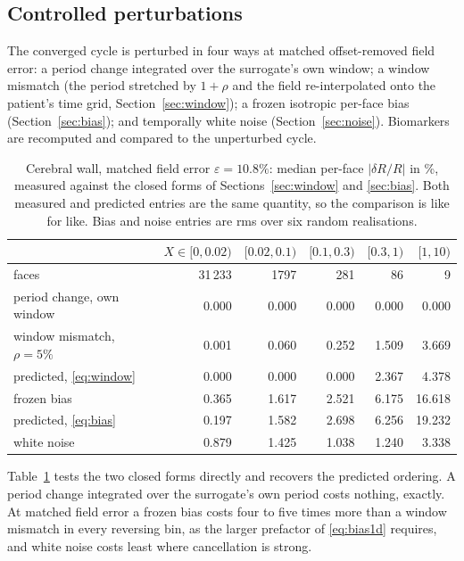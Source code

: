 \documentclass[11pt,a4paper]{article}
\newcommand{\eps}{\varepsilon}
\begin{document}
\subsection{Controlled perturbations}

The converged cycle is perturbed in four ways at matched offset-removed field
error: a period change integrated over the surrogate's own window; a window
mismatch (the period stretched by $1+\rho$ and the field re-interpolated onto
the patient's time grid, Section~\ref{sec:window}); a frozen isotropic
per-face bias (Section~\ref{sec:bias}); and temporally white noise
(Section~\ref{sec:noise}). Biomarkers are recomputed and compared to the
unperturbed cycle.

\begin{table}[t]
\centering
\caption{Cerebral wall, matched field error $\eps=10.8\%$: median per-face
$|\delta R/R|$ in \%, measured against the closed forms of
Sections~\ref{sec:window} and \ref{sec:bias}. Both measured and predicted
entries are the same quantity, so the comparison is like for like. Bias and
noise entries are rms over six random realisations.}
\label{tab:etype}
\begin{tabular}{l r r r r r}
\toprule
& $X\in[0,0.02)$ & $[0.02,0.1)$ & $[0.1,0.3)$ & $[0.3,1)$ & $[1,10)$\\
\midrule
faces & 31\,233 & 1797 & 281 & 86 & 9\\
\midrule
period change, own window & 0.000 & 0.000 & 0.000 & 0.000 & 0.000\\
window mismatch, $\rho=5\%$ & 0.001 & 0.060 & 0.252 & 1.509 & 3.669\\
\quad predicted, \eqref{eq:window} & 0.000 & 0.000 & 0.000 & 2.367 & 4.378\\
frozen bias & 0.365 & 1.617 & 2.521 & 6.175 & 16.618\\
\quad predicted, \eqref{eq:bias} & 0.197 & 1.582 & 2.698 & 6.256 & 19.232\\
white noise & 0.879 & 1.425 & 1.038 & 1.240 & 3.338\\
\bottomrule
\end{tabular}
\end{table}

Table~\ref{tab:etype} tests the two closed forms directly and recovers the
predicted ordering. A period change integrated over the surrogate's own
period costs nothing, exactly. At matched field error a frozen bias costs
four to five times more than a window mismatch in every reversing bin, as the
larger prefactor of \eqref{eq:bias1d} requires, and white noise costs least
where cancellation is strong.
\end{document}

